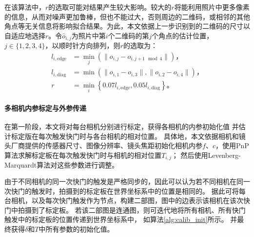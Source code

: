 \documentclass{scutmaster}
\begin{document}
在该算法中，$r$的选取可能对结果产生较大影响。较大的$r$将能利用照片中更多像素的信息，从而对噪声更加鲁棒，但也不能过大，否则周边的二维码，或相邻的其他角点等无关信息将影响拟合结果。为此，本文依据上一步识别到的二维码的尺寸以自适应地选择$r$。令$\hat{o}_{i,j}$为照片中第$i$个二维码的第$j$个角点的估计位置，$j\in\{1,2,3,4\}$，以顺时针方向排列，则$r$的选取为：
\begin{equation}
    \label{eq:r}
    \begin{aligned}
        l_{i,\textrm{edge}} & = \min_j\left(\|o_{i,j} - o_{i,j+1\mod 4}\|\right)\text{，} \\
        l_{i,\textrm{diag}} & = \min\left(\|o_{i,1} - o_{i,3}\|, \|o_{i,2} - o_{i,4}\|\right)\text{，} \\
        r & = \min_i\left\{0.07 l_{i,\textrm{edge}}, 0.05 l_{i,\textrm{diag}}\right\}\text{。}
    \end{aligned}
\end{equation}

\paragraph{多相机内参标定与外参传递}
在第一阶段，本文将对每台相机分别进行标定，获得各相机的内参初始化值
并估计标定版在每次触发快门时与各台相机的相对位置。
具体地，本文依据相机和镜头厂商提供的传感器尺寸、图像分辨率、镜头焦距初始化相机内参$f$、$c$，使用PnP算法求解标定板在每次触发快门时与相机的相对位置$T_{i,j}$；
然后使用Levenberg-Marquardt算法对这些参数进行调整。

由于不同相机的同一次快门的触发是严格同步的，因此可以认为若不同相机在同一次快门的触发时，拍摄到的标定板在世界坐标系中的位置是相同的。
据此可将每台相机，以及每次快门触发作为节点，构建二部图，图中的边表示该相机在该次快门中拍摄到了标定板。
若该二部图是连通图，则可迭代地将所有相机、所有快门触发中的标定板的位置传递到世界坐标系中，
如算法\ref{alg:calib_init}所示。
并最终获得$\delta$和$T$中所有参数的初始化值。
\end{document}
